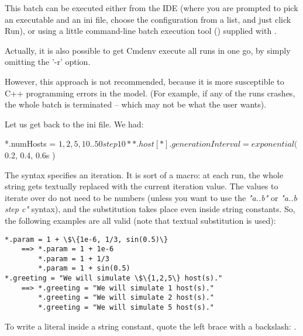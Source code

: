 This batch can be executed either from the {\opp} IDE (where you are
prompted to pick an executable and an ini file, choose the configuration
from a list, and just click Run), or using a little command-line
batch execution tool () supplied with {\opp}.

Actually, it is also possible to get Cmdenv execute all runs in one go,
by simply omitting the '-r' option.




However, this approach is not recommended, because it is more
susceptible to C++ programming errors in the model. (For example, if
any of the runs crashes, the whole batch is terminated -- which may
not be what the user wants).

Let us get back to the ini file. We had:

\begin{inifile}
*.numHosts = ${1, 2, 5, 10..50 step 10}
**.host[*].generationInterval = exponential( ${0.2, 0.4, 0.6}s )
\end{inifile}


The  syntax specifies an iteration. It is sort of a macro: at
each run, the whole  string gets textually replaced with the
current iteration value. The values to iterate over do not need to be
numbers (unless you want to use the \textit{"a..b"} or
\textit{"a..b step c"} syntax), and the
substitution takes place even inside string constants. So, the
following examples are all valid (note that textual substitution is
used):

\begin{Verbatim}[commandchars=\\\{\}]
*.param = 1 + \$\{1e-6, 1/3, sin(0.5)\}
    ==> *.param = 1 + 1e-6
        *.param = 1 + 1/3
        *.param = 1 + sin(0.5)
*.greeting = "We will simulate \$\{1,2,5\} host(s)."
    ==> *.greeting = "We will simulate 1 host(s)."
        *.greeting = "We will simulate 2 host(s)."
        *.greeting = "We will simulate 5 host(s)."
\end{Verbatim}

To write a literal  inside a string constant, quote
the left brace with a backslash: .

